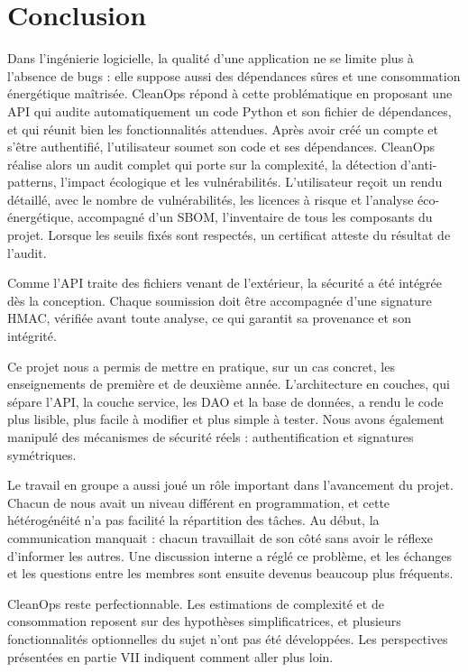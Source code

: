 \documentclass[a4paper,12pt]{article}
\begin{document}
\newpage{}

\section*{Conclusion}\label{conclusion}

Dans l'ingénierie logicielle, la qualité d'une application ne se limite
plus à l'absence de bugs : elle suppose aussi des dépendances sûres et
une consommation énergétique maîtrisée. CleanOps répond à cette
problématique en proposant une API qui audite automatiquement un code
Python et son fichier de dépendances, et qui réunit bien les
fonctionnalités attendues. Après avoir créé un compte et s'être
authentifié, l'utilisateur soumet son code et ses dépendances. CleanOps
réalise alors un audit complet qui porte sur la complexité, la détection
d'anti-patterns, l'impact écologique et les vulnérabilités.
L'utilisateur reçoit un rendu détaillé, avec le nombre de
vulnérabilités, les licences à risque et l'analyse éco-énergétique,
accompagné d'un SBOM, l'inventaire de tous les composants du projet.
Lorsque les seuils fixés sont respectés, un certificat atteste du
résultat de l'audit.

Comme l'API traite des fichiers venant de l'extérieur, la sécurité a été
intégrée dès la conception. Chaque soumission doit être accompagnée
d'une signature HMAC, vérifiée avant toute analyse, ce qui garantit sa
provenance et son intégrité.

Ce projet nous a permis de mettre en pratique, sur un cas concret, les
enseignements de première et de deuxième année. L'architecture en
couches, qui sépare l'API, la couche service, les DAO et la base de
données, a rendu le code plus lisible, plus facile à modifier et plus
simple à tester. Nous avons également manipulé des mécanismes de
sécurité réels : authentification et signatures symétriques.

Le travail en groupe a aussi joué un rôle important dans l'avancement du
projet. Chacun de nous avait un niveau différent en programmation, et
cette hétérogénéité n'a pas facilité la répartition des tâches. Au
début, la communication manquait : chacun travaillait de son côté sans
avoir le réflexe d'informer les autres. Une discussion interne a réglé
ce problème, et les échanges et les questions entre les membres sont
ensuite devenus beaucoup plus fréquents.

CleanOps reste perfectionnable. Les estimations de complexité et de
consommation reposent sur des hypothèses simplificatrices, et plusieurs
fonctionnalités optionnelles du sujet n'ont pas été développées. Les
perspectives présentées en partie VII indiquent comment aller plus loin.
\end{document}
